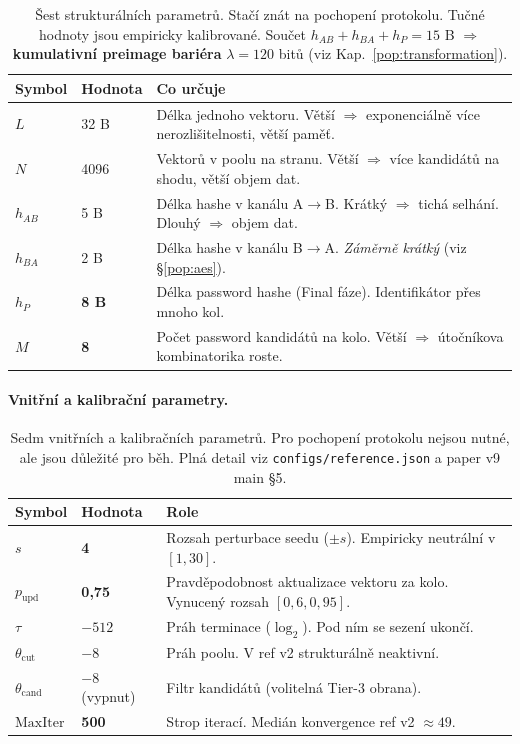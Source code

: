 \documentclass[11pt,a4paper]{article}
\begin{document}
\begin{table}[ht]
\centering
\small
\begin{tabular}{lll}
\toprule
Symbol & Hodnota & Co určuje \\
\midrule
$L$ & 32 B & Délka jednoho vektoru. Větší $\Rightarrow$ exponenciálně více nerozlišitelnosti, větší paměť. \\
$N$ & 4096 & Vektorů v poolu na stranu. Větší $\Rightarrow$ více kandidátů na shodu, větší objem dat. \\
$h_{AB}$ & 5 B & Délka hashe v kanálu A$\to$B. Krátký $\Rightarrow$ tichá selhání. Dlouhý $\Rightarrow$ objem dat. \\
$h_{BA}$ & 2 B & Délka hashe v kanálu B$\to$A. \emph{Záměrně krátký} (viz §\ref{pop:aes}). \\
$h_P$ & \textbf{8 B} & Délka password hashe (Final fáze). Identifikátor přes mnoho kol. \\
$M$ & \textbf{8} & Počet password kandidátů na kolo. Větší $\Rightarrow$ útočníkova kombinatorika roste. \\
\bottomrule
\end{tabular}
\caption{Šest strukturálních parametrů. Stačí znát na pochopení protokolu. Tučné hodnoty jsou empiricky kalibrované. Součet $h_{AB} + h_{BA} + h_P = 15$ B $\Rightarrow$ \textbf{kumulativní preimage bariéra} $\lambda = 120$ bitů (viz Kap.~\ref{pop:transformation}).}
\label{tab:pop-params-structural}
\end{table}

\paragraph{Vnitřní a kalibrační parametry.}

\begin{table}[ht]
\centering
\small
\begin{tabular}{lll}
\toprule
Symbol & Hodnota & Role \\
\midrule
$s$ & \textbf{4} & Rozsah perturbace seedu ($\pm s$). Empiricky neutrální v $[1, 30]$. \\
$p_\text{upd}$ & \textbf{0{,}75} & Pravděpodobnost aktualizace vektoru za kolo. Vynucený rozsah $[0{,}6, 0{,}95]$. \\
$\tau$ & $-512$ & Práh terminace ($\log_2$). Pod ním se sezení ukončí. \\
$\theta_\text{cut}$ & $-8$ & Práh poolu. V ref v2 strukturálně neaktivní. \\
$\theta_\text{cand}$ & \textbf{$-8$} (vypnut) & Filtr kandidátů (volitelná Tier-3 obrana). \\
$\text{MaxIter}$ & \textbf{500} & Strop iterací. Medián konvergence ref v2 $\approx 49$. \\
\bottomrule
\end{tabular}
\caption{Sedm vnitřních a kalibračních parametrů. Pro pochopení protokolu nejsou nutné, ale jsou důležité pro běh. Plná detail viz \texttt{configs/reference.json} a paper v9 main §5.}
\label{tab:pop-params-internal}
\end{table}
\end{document}
